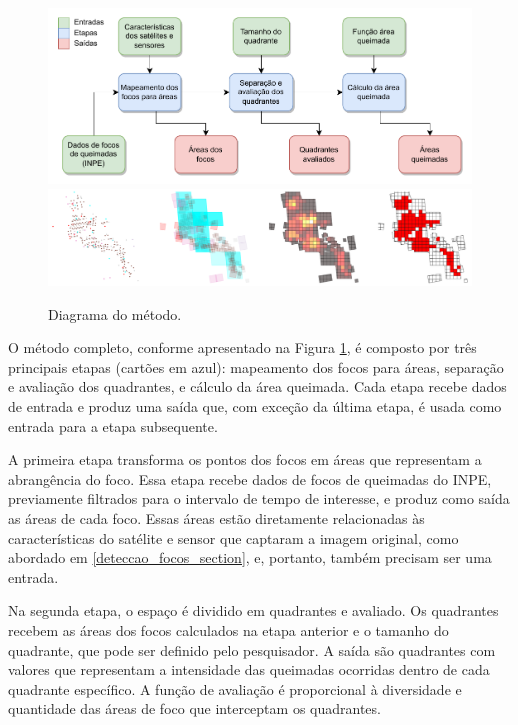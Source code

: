 \documentclass[cic,tc]{iiufrgs}
\begin{document}
\begin{figure}[H]
    \caption{Diagrama do método.}
    \begin{center}
        \includegraphics[width=35em]{metodologica_workflow}
        \includegraphics[width=35em]{exemplo_metodo_completo}
    \end{center}
    \label{fig:metodologica_workflow}
\end{figure}

O método completo, conforme apresentado na Figura \ref{fig:metodologica_workflow}, é composto por três principais etapas (cartões em azul): mapeamento dos focos para áreas, separação e avaliação dos quadrantes, e cálculo da área queimada. Cada etapa recebe dados de entrada e produz uma saída que, com exceção da última etapa, é usada como entrada para a etapa subsequente.

A primeira etapa transforma os pontos dos focos em áreas que representam a abrangência do foco. Essa etapa recebe dados de focos de queimadas do INPE, previamente filtrados para o intervalo de tempo de interesse, e produz como saída as áreas de cada foco. Essas áreas estão diretamente relacionadas às características do satélite e sensor que captaram a imagem original, como abordado em \ref{deteccao_focos_section}, e, portanto, também precisam ser uma entrada.

Na segunda etapa, o espaço é dividido em quadrantes e avaliado. Os quadrantes recebem as áreas dos focos calculados na etapa anterior e o tamanho do quadrante, que pode ser definido pelo pesquisador. A saída são quadrantes com valores que representam a intensidade das queimadas ocorridas dentro de cada quadrante específico. A função de avaliação é proporcional à diversidade e quantidade das áreas de foco que interceptam os quadrantes.
\end{document}
